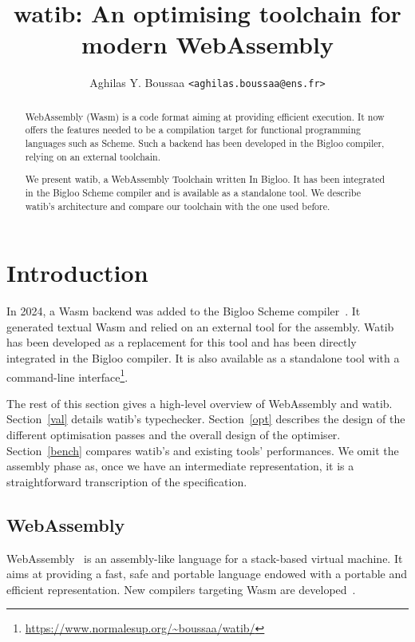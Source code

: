 \documentclass[a4paper,11pt]{article}
\author{Aghilas Y. Boussaa \texttt{<aghilas.boussaa@ens.fr>}}
\title{\textsf{watib}: An optimising toolchain for modern WebAssembly}
\begin{document}
\sloppy
\maketitle
\begin{abstract}
  WebAssembly (Wasm) is a code format aiming at providing efficient execution.
  It now offers the features needed to be a compilation target for functional
  programming languages such as Scheme. Such a backend has been developed in
  the Bigloo compiler, relying on an external toolchain.

  We present \textsf{watib}, a WebAssembly Toolchain written In Bigloo. It has
  been integrated in the Bigloo Scheme compiler and is available as a standalone
  tool. We describe \textsf{watib}'s architecture and compare our toolchain with
  the one used before.
\end{abstract}

\section{Introduction}
In 2024, a Wasm backend was added to the Bigloo Scheme compiler~\cite{Bigloo}.
It generated textual Wasm and relied on an external tool for the assembly.
\textsf{Watib} has been developed as a replacement for this tool and has been
directly integrated in the Bigloo compiler. It is also available as a standalone
tool with a command-line
interface\footnote{\url{https://www.normalesup.org/~boussaa/watib/}}.

The rest of this section gives a high-level overview of WebAssembly and
\textsf{watib}. Section~\ref{val} details \textsf{watib}'s typechecker.
Section~\ref{opt} describes the design of the different optimisation passes and
the overall design of the optimiser. Section~\ref{bench} compares
\textsf{watib}'s and existing tools' performances. We omit the assembly phase
as, once we have an intermediate representation, it is a straightforward
transcription of the specification.
\subsection{WebAssembly}
WebAssembly~\cite{haas2017bringing} is an assembly-like language for a
stack-based virtual machine. It aims at providing a fast, safe and portable
language endowed with a portable and efficient representation. New compilers
targeting Wasm are developed~\cite{emscripten, kotlin, ocaml}.
\end{document}
